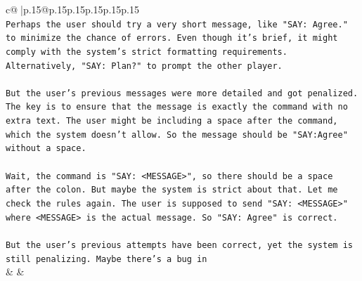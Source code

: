 \documentclass{article}
\begin{document}
{\begin{supertabular}{c@{$\;$}|p{.15\linewidth}@{}p{.15\linewidth}p{.15\linewidth}p{.15\linewidth}p{.15\linewidth}p{.15\linewidth}}
{{{\\ 
\texttt{Perhaps the user should try a very short message, like "SAY: Agree." to minimize the chance of errors. Even though it's brief, it might comply with the system's strict formatting requirements. Alternatively, "SAY: Plan?" to prompt the other player.} \\
\\ 
\texttt{But the user's previous messages were more detailed and got penalized. The key is to ensure that the message is exactly the command with no extra text. The user might be including a space after the command, which the system doesn't allow. So the message should be "SAY:Agree" without a space.} \\
\\ 
\texttt{Wait, the command is "SAY: <MESSAGE>", so there should be a space after the colon. But maybe the system is strict about that. Let me check the rules again. The user is supposed to send "SAY: <MESSAGE>" where <MESSAGE> is the actual message. So "SAY: Agree" is correct.} \\
\\ 
\texttt{But the user's previous attempts have been correct, yet the system is still penalizing. Maybe there's a bug in} \\
            }
        }
    }
    & & \\ \\


\end{supertabular}}
\end{document}
